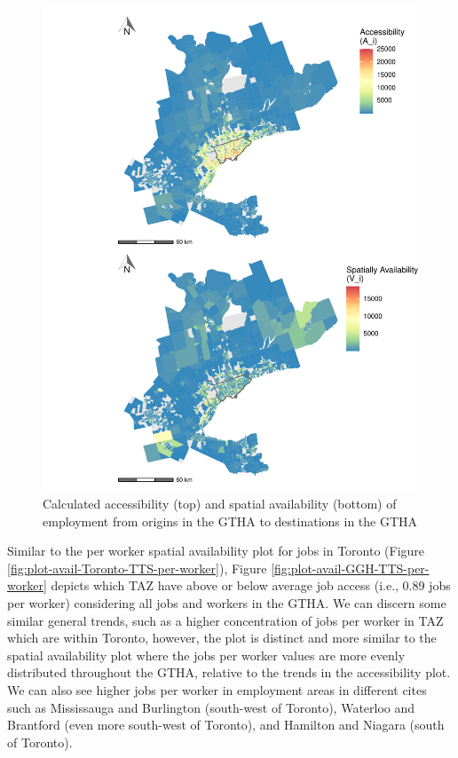 \documentclass[]{elsarticle} %
\begin{document}
\begin{figure}
\includegraphics[width=1\linewidth]{Spatial-Availability_files/figure-latex/plot-access-SA-GGH-TTS-1} \caption{\label{fig:plot-access-SA-GGH-TTS}Calculated accessibility (top) and spatial availability (bottom) of employment from origins in the GTHA to destinations in the GTHA}\label{fig:plot-access-SA-GGH-TTS}
\end{figure}

\newpage

Similar to the per worker spatial availability plot for jobs in Toronto
(Figure \ref{fig:plot-avail-Toronto-TTS-per-worker}), Figure
\ref{fig:plot-avail-GGH-TTS-per-worker} depicts which TAZ have above or
below average job access (i.e., 0.89 jobs per worker) considering all
jobs and workers in the GTHA. We can discern some similar general
trends, such as a higher concentration of jobs per worker in TAZ which
are within Toronto, however, the plot is distinct and more similar to
the spatial availability plot where the jobs per worker values are more
evenly distributed throughout the GTHA, relative to the trends in the
accessibility plot. We can also see higher jobs per worker in employment
areas in different cites such as Mississauga and Burlington (south-west
of Toronto), Waterloo and Brantford (even more south-west of Toronto),
and Hamilton and Niagara (south of Toronto).
\end{document}
